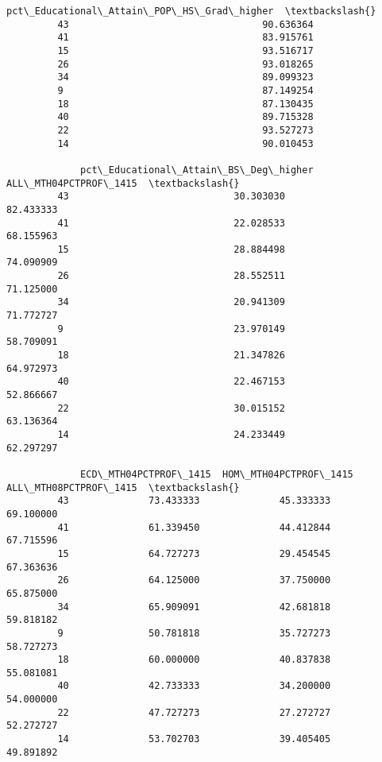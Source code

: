 \documentclass[11pt]{article}
\begin{document}
\begin{Verbatim}[commandchars=\\\{\}]
             pct\_Educational\_Attain\_POP\_HS\_Grad\_higher  \textbackslash{}
         43                                  90.636364   
         41                                  83.915761   
         15                                  93.516717   
         26                                  93.018265   
         34                                  89.099323   
         9                                   87.149254   
         18                                  87.130435   
         40                                  89.715328   
         22                                  93.527273   
         14                                  90.010453   
         
             pct\_Educational\_Attain\_BS\_Deg\_higher  ALL\_MTH04PCTPROF\_1415  \textbackslash{}
         43                             30.303030              82.433333   
         41                             22.028533              68.155963   
         15                             28.884498              74.090909   
         26                             28.552511              71.125000   
         34                             20.941309              71.772727   
         9                              23.970149              58.709091   
         18                             21.347826              64.972973   
         40                             22.467153              52.866667   
         22                             30.015152              63.136364   
         14                             24.233449              62.297297   
         
             ECD\_MTH04PCTPROF\_1415  HOM\_MTH04PCTPROF\_1415  ALL\_MTH08PCTPROF\_1415  \textbackslash{}
         43              73.433333              45.333333              69.100000   
         41              61.339450              44.412844              67.715596   
         15              64.727273              29.454545              67.363636   
         26              64.125000              37.750000              65.875000   
         34              65.909091              42.681818              59.818182   
         9               50.781818              35.727273              58.727273   
         18              60.000000              40.837838              55.081081   
         40              42.733333              34.200000              54.000000   
         22              47.727273              27.272727              52.272727   
         14              53.702703              39.405405              49.891892   
         

\end{Verbatim}
\end{document}
